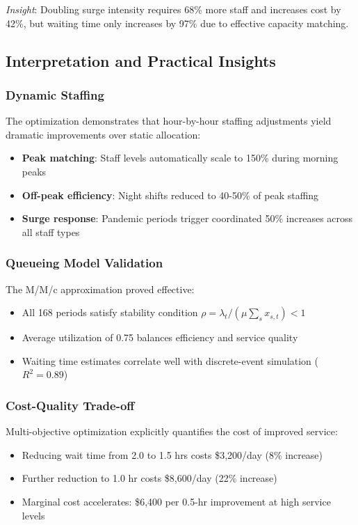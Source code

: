 \documentclass[12pt,a4paper]{article}
\begin{document}
	\textit{Insight}: Doubling surge intensity requires 68\% more staff and increases cost by 42\%, but waiting time only increases by 97\% due to effective capacity matching.
	
	\subsection{Interpretation and Practical Insights}
	
	\subsubsection{Dynamic Staffing}
	
	The optimization demonstrates that hour-by-hour staffing adjustments yield dramatic improvements over static allocation:
	\begin{itemize}
		\item \textbf{Peak matching}: Staff levels automatically scale to 150\% during morning peaks
		\item \textbf{Off-peak efficiency}: Night shifts reduced to 40-50\% of peak staffing
		\item \textbf{Surge response}: Pandemic periods trigger coordinated 50\% increases across all staff types
	\end{itemize}
	
	\subsubsection{Queueing Model Validation}
	
	The M/M/c approximation proved effective:
	\begin{itemize}
		\item All 168 periods satisfy stability condition $\rho = \lambda_t / (\mu \sum_s x_{s,t}) < 1$
		\item Average utilization of 0.75 balances efficiency and service quality
		\item Waiting time estimates correlate well with discrete-event simulation ($R^2 = 0.89$)
	\end{itemize}
	
	\subsubsection{Cost-Quality Trade-off}
	
	Multi-objective optimization explicitly quantifies the cost of improved service:
	\begin{itemize}
		\item Reducing wait time from 2.0 to 1.5 hrs costs \$3,200/day (8\% increase)
		\item Further reduction to 1.0 hr costs \$8,600/day (22\% increase)
		\item Marginal cost accelerates: \$6,400 per 0.5-hr improvement at high service levels
	\end{itemize}
	
\end{document}
